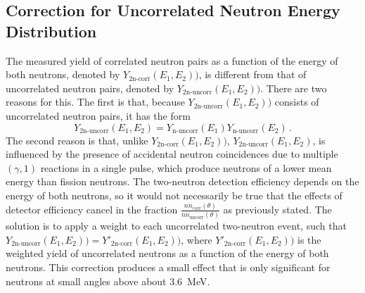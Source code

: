 \subsection{Correction for Uncorrelated Neutron Energy Distribution}
The measured yield of correlated neutron pairs as a function of the energy of both neutrons,  denoted by $Y_{\text{2n-corr}}(E_1,E_2))$, is different from that of uncorrelated neutron pairs, denoted by $Y_{\text{2n-uncorr}}(E_1,E_2))$.
There are two reasons for this.
The first is that, because $Y_{\text{2n-uncorr}}(E_1,E_2))$ consists of uncorrelated neutron pairs, it has the form
\begin{equation}
	 Y_{\text{2n-uncorr}}(E_1,E_2) = Y_{\text{n-uncorr}}(E_1) Y_{\text{n-uncorr}}(E_2) \, .
\end{equation}
The second reason is that, unlike $Y_{\text{2n-corr}}(E_1,E_2))$, $Y_{\text{2n-uncorr}}(E_1,E_2) $, is influenced by the presence of accidental neutron coincidences due to multiple $(\gamma, 1)$ reactions in a single pulse, which produce neutrons of a lower mean energy than fission neutrons.
The two-neutron detection efficiency depends on the energy of both neutrons, so it would not necessarily be true that the effects of detector efficiency cancel in the fraction $\frac{nn_{\text{corr}}(\theta)}{nn_{\text{uncorr}}(\theta)}$ as previously stated.
The solution is to apply a weight to each uncorrelated two-neutron event, such that $Y_{\text{2n-uncorr}}(E_1,E_2))=Y'_{\text{2n-corr}}(E_1,E_2))$,
where $Y'_{\text{2n-corr}}(E_1,E_2))$ is the weighted yield of uncorrelated neutrons as a function of the energy of both neutrons.
This correction produces a small effect that is only significant for neutrons at small angles above about 3.6~MeV. 


